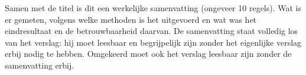 Samen met de titel is dit een werkelijke samenvatting (ongeveer 10 regels). 
Wat is er gemeten, volgens welke methoden is het uitgevoerd en wat was het eindresultaat en de betrouwbaarheid daarvan. 
De samenvatting staat volledig los van het verslag: hij moet leesbaar en begrijpelijk zijn zonder het eigenlijke verslag erbij nodig te hebben. Omgekeerd moet ook het verslag leesbaar zijn zonder de samenvatting erbij. 